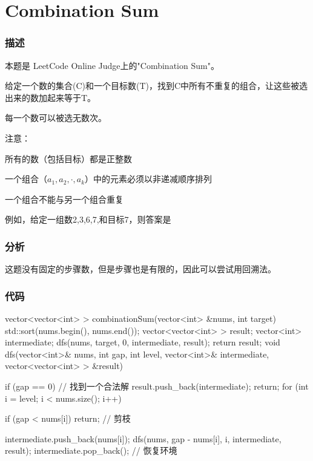 \section{Combination Sum} %

\subsubsection{描述}
本题是 LeetCode Online Judge上的"Combination Sum"。

给定一个数的集合(C)和一个目标数(T)，找到C中所有不重复的组合，让这些被选出来的数加起来等于T。

每一个数可以被选无数次。

注意：
\begindot
\item 所有的数（包括目标）都是正整数
\item 一个组合（$a_1,a_2,\cdot,a_k$）中的元素必须以非递减顺序排列
\item 一个组合不能与另一个组合重复
\myenddot

例如，给定一组数2,3,6,7,和目标7，则答案是
\begin{Code}
[7]
[2, 2, 3] 
\end{Code}

\subsubsection{分析}
这题没有固定的步骤数，但是步骤也是有限的，因此可以尝试用回溯法。

\subsubsection{代码}

\begin{Codex}[label=combination_sum.cpp]
    vector<vector<int> > combinationSum(vector<int> &nums, int target) {
        std::sort(nums.begin(), nums.end());
        vector<vector<int> > result;
        vector<int> intermediate;
        dfs(nums, target, 0, intermediate, result);
        return result;
    }
    void dfs(vector<int>& nums, int gap, int level,
            vector<int>& intermediate, vector<vector<int> > &result) {
        if (gap == 0) {  // 找到一个合法解
            result.push_back(intermediate);
            return;
        }
        for (int i = level; i < nums.size(); i++) {
            if (gap < nums[i]) return; // 剪枝

            intermediate.push_back(nums[i]);
            dfs(nums, gap - nums[i], i, intermediate, result);
            intermediate.pop_back();  // 恢复环境
        }
    }
\end{Codex}


